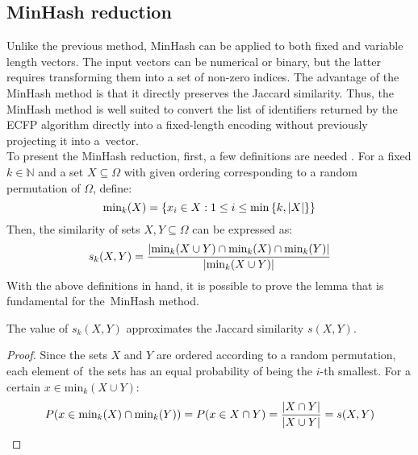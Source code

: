 \subsection{MinHash reduction}
Unlike the previous method, MinHash can be applied to both fixed and variable length vectors. The input vectors can be numerical or binary, but the latter requires transforming them into a set of non-zero indices. The advantage of the MinHash method is that it directly preserves the Jaccard similarity. Thus, the MinHash method is well suited to convert the list of identifiers returned by the ECFP algorithm directly into a fixed-length encoding without previously projecting it into a~vector. \\
To present the MinHash reduction, first, a few definitions are needed \cite{broder1997resemblance, musco2020minhash}. For a fixed \( k \in \mathbb{N} \) and a set \( X \subseteq \Omega \) with given ordering corresponding to a random permutation of \( \Omega \), define:
\[
    \text{min}_k(X) = \left\{ x_i \in X : 1 \leq i \leq \min\left\{ k, \left| X \right| \right\} \right\}
\]
Then, the similarity of sets \( X, Y \subseteq \Omega \) can be expressed as:
\[
    s_k(X,Y) = \frac{\left| \text{min}_k(X \cup Y) \cap \text{min}_k(X) \cap \text{min}_k(Y) \right|}{\left| \text{min}_k(X \cup Y) \right|}
\]
With the above definitions in hand, it is possible to prove the lemma that is fundamental for the~MinHash method.
\begin{lemma}
    The value of \( s_k(X,Y) \) approximates the Jaccard similarity \( s(X,Y) \).
\end{lemma}
\begin{proof}
    Since the sets \( X \) and \( Y \) are ordered according to a random permutation, each element of~the sets has an equal probability of being the \( i\)-th smallest. For a certain \( x \in \text{min}_k(X \cup Y) \):
    \[
        P(x \in \text{min}_k(X) \cap \text{min}_k(Y)) =  P(x \in  X \cap Y) = \frac{\left| X \cap Y \right|}{\left| X \cup Y \right|} = s(X,Y)
    \]
\end{proof}

